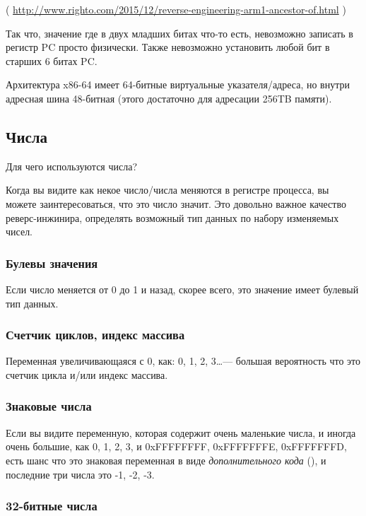 ( \url{http://www.righto.com/2015/12/reverse-engineering-arm1-ancestor-of.html} )

Так что, значение где в двух младших битах что-то есть, невозможно записать в регистр PC просто физически.
Также невозможно установить любой бит в старших 6 битах PC.

Архитектура x86-64 имеет 64-битные виртуальные указателя/адреса, но внутри адресная шина 48-битная
(этого достаточно для адресации 256TB памяти).

\subsection{Числа}

Для чего используются числа?

Когда вы видите как некое число/числа меняются в регистре процесса, вы можете заинтересоваться, что это число значит.
Это довольно важное качество реверс-инжинира, определять возможный тип данных по набору изменяемых чисел.

\subsubsection{Булевы значения}

Если число меняется от 0 до 1 и назад, скорее всего, это значение имеет булевый тип данных.

\subsubsection{Счетчик циклов, индекс массива}

Переменная увеличивающаяся с 0, как: 0, 1, 2, 3\dots --- большая вероятность что это счетчик цикла и/или индекс массива.

\subsubsection{Знаковые числа}

Если вы видите переменную, которая содержит очень маленькие числа, и иногда очень большие,
как 0, 1, 2, 3, и 0xFFFFFFFF, 0xFFFFFFFE, 0xFFFFFFFD,
есть шанс что это знаковая переменная в виде \emph{дополнительного кода} (),
и последние три числа это -1, -2, -3.

\subsubsection{32-битные числа}

